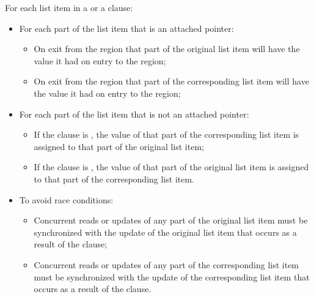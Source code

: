 For each list item in a  or a  clause: \begin{itemize}

    \item For each part of the list item that is an attached pointer:  \begin{itemize}

        \item On exit from the region that part of the original list item will
        have the value it had on entry to the region;

        \item On exit from the region that part of the corresponding list item will
        have the value it had on entry to the region;

   \end{itemize}

    \item For each part of the list item that is not an attached pointer: \begin{itemize}

        \item If the clause is , the value of that part of the
        corresponding list item is assigned to that part of the original list
       item;

        \item If the clause is , the value of that part of the
        original list item is assigned to that part of the corresponding list
        item.

   \end{itemize}

   \item To avoid race conditions: \begin{itemize}

        \item Concurrent reads or updates of any part
        of the original list item must be synchronized with the update of the
        original list item that occurs as a result of the  clause;

        \item Concurrent reads or updates of any part
        of the corresponding list item must be synchronized with the update of the
        corresponding list item that occurs as a result of the  clause.

   \end{itemize}

\end{itemize}


